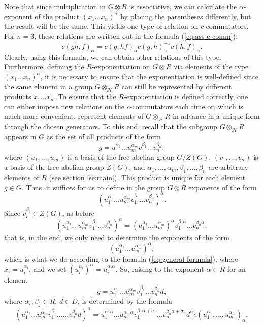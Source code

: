 \documentclass[11pt]{article}
\theoremstyle{definition}
\begin{document}
Note that since multiplication in $G \otimes R$ is associative, we can calculate the $\alpha$-exponent of the product $(x_1 \ldots x_n)^\alpha$ by placing the parentheses differently, but the result will be the same. This yields one type of relation on $c$-commutators. For $n = 3$, these relations are written out in the formula (\ref{eq:ass-c-comm}):
$$
c(gh,f)_\alpha=c(g,hf)_\alpha c(g,h)_\alpha^{-1} c(h,f)_\alpha .
$$
Clearly, using this formula, we can obtain other relations of this type. Furthermore, defining the $R$-exponentiation on $G\otimes R$ via elements of the type $(x_1 \ldots x_n)^\alpha$, it is necessary to ensure that the exponentiation is well-defined since the same element in a group  $G \otimes_{\mathcal{H}} R$ can still be represented by different products $x_1 \ldots x_n$.  To ensure that the $R$-exponentiation is defined correctly, one can either impose new relations on the $c$-commutators each time or, which is much more convenient, represent elements of $G\otimes_{\mathcal{H}} R$ in advance in a unique form through the chosen generators. To this end, recall that the subgroup $G\otimes_{\mathcal{H}} R$ appears in $G$ as the set of all products of the form
\begin{equation}
   g = u_1^{\alpha_1} \ldots u_m^{\alpha_m}v_1^{\beta_1} \ldots v_n^{\beta_n}, 
\end{equation}
where $(u_1, \ldots, u_m)$ is a basis of the free abelian group $G/Z(G)$, $(v_1, \ldots,v_n)$ is a basis of the free abelian group $Z(G)$, and $\alpha_1, \ldots,\alpha_m, \beta_1, \ldots,\beta_n$ are arbitrary elements of $R$ (see section \ref{se:main}). This product is unique for each element $g \in G$. Thus, it suffices for us to define in the group $G\otimes R$ exponents of the form
$$
 (u_1^{\alpha_1} \ldots u_m^{\alpha_m}v_1^{\beta_1} \ldots v_n^{\beta_n})^\alpha.
$$
Since $v_i^{\beta_i} \in Z(G)$, as before
$$
 (u_1^{\alpha_1} \ldots u_m^{\alpha_m}v_1^{\beta_1} \ldots v_n^{\beta_n})^\alpha = (u_1^{\alpha_1} \ldots u_m^{\alpha_m})^\alpha v_1^{\beta_1\alpha} \ldots v_n^{\beta_n\alpha},
$$
that is, in the end, we only need to determine the exponents of the form
$$
(u_1^{\alpha_1} \ldots u_m^{\alpha_m})^\alpha,
$$
which is what we do according to the formula (\ref{eq:general-formula}), where $x_i = u_i^{\alpha_i}$, and we set $(u_i^{\alpha_i})^\alpha = u_i^{\alpha_i\alpha}$. So, raising to the exponent $\alpha \in R$ for an element
$$
g=  u_1^{\alpha_1} \ldots u_m^{\alpha_m}v_1^{\beta_1} \ldots v_n^{\beta_n}d,
$$ 
where $\alpha_i, \beta_j \in R$, $d \in D$, is determined by the formula
\begin{equation} \label{eq:main-def}
(u_1^{\alpha_1} \ldots u_m^{\alpha_m}v_1^{\beta_1} \ldots \ldots v_n^{\beta_n}d)^\alpha =     u_1^{\alpha_1\alpha} \ldots u_m^{\alpha_m \alpha}v_1^{\beta_1\alpha+\sigma_1} \ldots v_n^{\beta_n\alpha +\sigma_n}d^\alpha c(u_1^{\alpha_1}, \ldots,u_m^{\alpha_m})_\alpha,
\end{equation}
\end{document}
